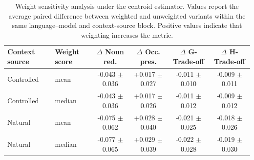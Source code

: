\begin{table}[t]
\centering
\small
\caption{Weight sensitivity analysis under the centroid estimator. Values report the average paired difference between weighted and unweighted variants within the same language--model and context-source block. Positive values indicate that weighting increases the metric.}
\label{tab:weight_sensitivity}
\begin{tabular}{llcccc}
\toprule
Context source & Weight score & $\Delta$ Noun red. & $\Delta$ Occ. pres. & $\Delta$ G-Trade-off & $\Delta$ H-Trade-off \\
\midrule
Controlled & mean & -0.043 $\pm$ 0.036 & +0.017 $\pm$ 0.027 & -0.011 $\pm$ 0.010 & -0.009 $\pm$ 0.011 \\
Controlled & median & -0.043 $\pm$ 0.036 & +0.017 $\pm$ 0.026 & -0.011 $\pm$ 0.012 & -0.009 $\pm$ 0.012 \\
Natural & mean & -0.075 $\pm$ 0.062 & +0.028 $\pm$ 0.040 & -0.021 $\pm$ 0.025 & -0.018 $\pm$ 0.026 \\
Natural & median & -0.077 $\pm$ 0.065 & +0.029 $\pm$ 0.039 & -0.022 $\pm$ 0.028 & -0.019 $\pm$ 0.030 \\
\bottomrule
\end{tabular}
\end{table}